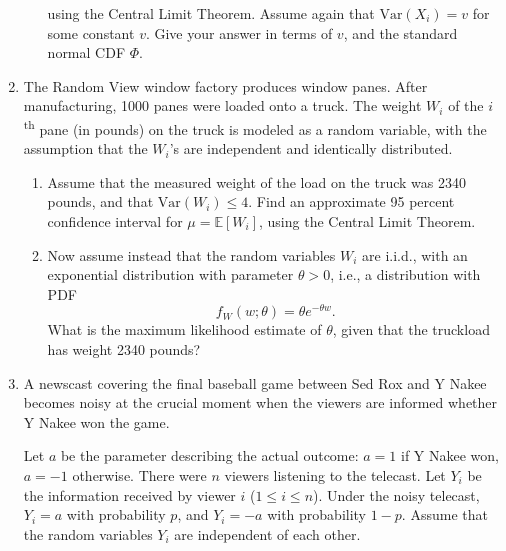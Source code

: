 \documentclass[a4paper,9pt,landscape]{extarticle}
\newcommand{\var}{\textrm{Var}}
\begin{document}
\begin{multicols*}{3}
\begin{enumerate}
\begin{enumerate}
		using the Central Limit Theorem. Assume again that $\var(X_i)=v$ for some constant $v$. Give your answer in terms of $v$, and the standard normal CDF $\Phi$.
	\end{enumerate}
	\item The Random View window factory produces window panes. After manufacturing, 1000 panes were loaded onto a truck. The weight $W_i$ of the $i$\textsuperscript{th} pane (in pounds) on the truck is modeled as a random variable, with the assumption that the $W_i$'s are independent and identically distributed.
	\begin{enumerate}
		\item Assume that the measured weight of the load on the truck was 2340 pounds, and that $\var(W_i)\leq4$. Find an approximate 95 percent confidence interval for $\mu=\mathds{E}[W_i]$, using the Central Limit Theorem.
		\item Now assume instead that the random variables $W_i$ are i.i.d., with an exponential distribution with parameter $\theta>0$, i.e., a distribution with PDF $$f_W(w;\theta)=\theta e^{-\theta w}.$$ What is the maximum likelihood estimate of $\theta$, given that the truckload has weight 2340 pounds?
	\end{enumerate}
	\item A newscast covering the final baseball game between Sed Rox and Y Nakee becomes noisy at the crucial moment when the viewers are informed whether Y Nakee won the game.
	
	Let $a$ be the parameter describing the actual outcome: $a=1$ if Y Nakee won, $a=-1$ otherwise. There were $n$ viewers listening to the telecast. Let $Y_i$ be the information received by viewer $i$ ($1\leq i\leq n$). Under the noisy telecast, $Y_i=a$ with probability $p$, and $Y_i=-a$ with probability $1-p$. Assume that the random variables $Y_i$ are independent of each other.
	

\end{enumerate}
\end{multicols*}
\end{document}
